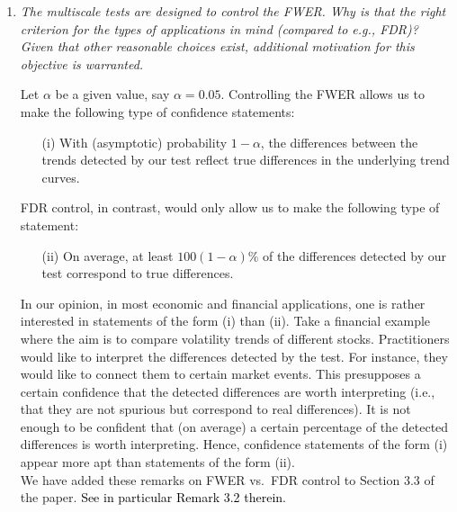 \documentclass[a4paper,12pt]{article}
\newcommand{\reference}[1]{\textcolor{black}{#1}}
\begin{document}
\begin{enumerate}[label=\arabic*.,leftmargin=0.6cm]
  
\item \textit{The multiscale tests are designed to control the FWER. Why is that the right criterion for the types of applications in mind (compared to e.g., FDR)? Given that other reasonable choices exist, additional motivation for this objective is warranted.}

Let $\alpha$ be a given value, say $\alpha = 0.05$. Controlling the FWER allows us to make the following type of confidence statements:
\begin{itemize}[leftmargin=0.75cm]
\item[(i)] With (asymptotic) probability $1-\alpha$, the differences between the trends detected by our test reflect true differences in the underlying trend curves. 
\end{itemize}
FDR control, in contrast, would only allow us to make the following type of statement:
\begin{itemize}[leftmargin=0.75cm]
\item[(ii)] On average, at least $100 (1-\alpha) \%$ of the differences detected by our test correspond to true differences. 
\end{itemize}
In our opinion, in most economic and financial applications, one is rather interested in statements of the form (i) than (ii). Take a financial example where the aim is to compare volatility trends of different stocks. Practitioners would like to interpret the differences detected by the test. For instance, they would like to connect them to certain market events. This presupposes a certain confidence that the detected differences are worth interpreting (i.e., that they are not spurious but correspond to real differences). It is not enough to be confident that (on average) a certain percentage of the detected differences is worth interpreting. Hence, confidence statements of the form (i) appear more apt than statements of the form (ii). \\
We have added these remarks on FWER vs.\ FDR control to Section 3.3 of the paper. \reference{See in particular Remark 3.2 therein.}



\end{enumerate}
\end{document}
